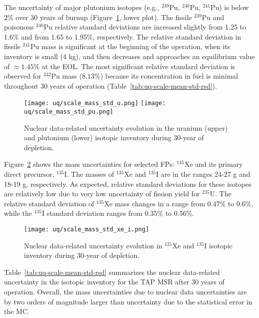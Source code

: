 The uncertainty of major plutonium isotopes (e.g., $^{239}$Pu, $^{240}$Pu, 
$^{241}$Pu) is below 2\% over 30 years of burnup 
(Figure~\ref{fig:uq-scale-u-pu}, lower plot). The fissile $^{239}$Pu and 
poisonous $^{240}$Pu relative standard deviations are increased slightly from 
1.25 to 1.6\% and from 1.65 to 1.95\%, respectively. The relative standard 
deviation in fissile $^{241}$Pu mass is significant at the beginning of the 
operation, when its inventory is small (4 kg), and then decreases and 
approaches an equilibrium value of $\approx1.45$\% at the \gls{EOL}. The 
most significant relative standard deviation is observed for $^{242}$Pu mass 
($8.13$\%) because its concentration in fuel is minimal throughout 30 years 
of operation (Table~\ref{tab:uq-scale-mean-std-rsd}).

\begin{figure}[hbp!] %
	\centering
	\texttt{[image: uq/scale\_mass\_std\_u.png]}
		\vspace{-12mm}
	\hspace{0.0mm}
	\texttt{[image: uq/scale\_mass\_std\_pu.png]}
		\vspace{+8mm}
	\caption{Nuclear data-related uncertainty evolution in the uranium (upper) 
	and plutonium (lower) isotopic inventory during 30-year of depletion.}
	\label{fig:uq-scale-u-pu}
\end{figure}

Figure~\ref{fig:uq-scale-xe-i} shows the mass uncertainties for selected 
\glspl{FP}: $^{135}$Xe and its primary direct precursor, $^{135}$I. The masses 
of $^{135}$Xe and $^{135}$I are in the ranges 24-27 g and 18-19 g, 
respectively. As expected, relative standard deviations for these isotopes are 
relatively low due to very low uncertainty of fission yield for $^{235}$U. The 
relative standard deviation of $^{135}$Xe mass changes in a range from 
0.47\% to 0.6\%, while the $^{135}$I standard deviation ranges from 0.35\% to 
0.56\%.
\begin{figure}[hbp!] %
	\centering
	\texttt{[image: uq/scale\_mass\_std\_xe\_i.png]}
	\caption{Nuclear data-related uncertainty evolution in $^{135}$Xe and 
	$^{135}$I isotopic inventory during 30-year of depletion.}
	\label{fig:uq-scale-xe-i}
\end{figure}

Table~\ref{tab:uq-scale-mean-std-rsd} summarizes the nuclear data-related 
uncertainty in the isotopic inventory for the \gls{TAP} \gls{MSR} after 30 
years of operation. Overall, the mass uncertainties due to nuclear data 
uncertainties are by two orders of magnitude larger than uncertainty due to 
the statistical error in the \gls{MC}.  

